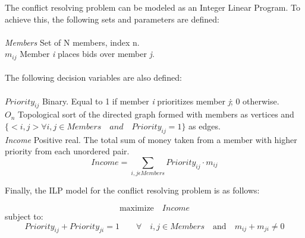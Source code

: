 \documentclass{article}
\begin{document}
The conflict resolving problem can be modeled as an Integer Linear Program. To achieve this, the following sets and parameters are defined:\\
\\
\textit{Members} \hspace{2.7cm} Set of N members, index n. \\
\textit{$m_{ij}$} \hspace{3.5cm}  Member \textit{i} places bids over member \textit{j}. \\
\\
The following decision variables are also defined:\\
\\
\textit{$Priority_{ij}$} \hspace{2.5cm} Binary. Equal to 1 if member \textit{i} prioritizes member \textit{j}; 0 otherwise. \\
\textit{$O_{n}$} \hspace{3.55cm} Topological sort of the directed graph formed with members as vertices and $\{<i,j> \forall i,j \in Members \quad and \quad Priority_{ij} = 1 \}$ as edges.\\ 
\textit{Income} \hspace{2.95cm} Positive real. The total sum of money taken from a member with higher priority from each unordered pair.
\begin{displaymath}
    Income = \sum_{i,j \epsilon Members} Priority_{ij} \cdot m_{ij}
\end{displaymath}

Finally, the ILP model for the conflict resolving problem is as follows:

\begin{equation}
    \textrm{maximize} \quad Income
\end{equation}
 subject to:
\begin{equation}
     Priority_{ij} + Priority_{ji} = 1 \qquad \forall \quad i,j \in Members \quad \textrm{and} \quad m_{ij} + m_{ji} \neq 0
\end{equation}
\end{document}
